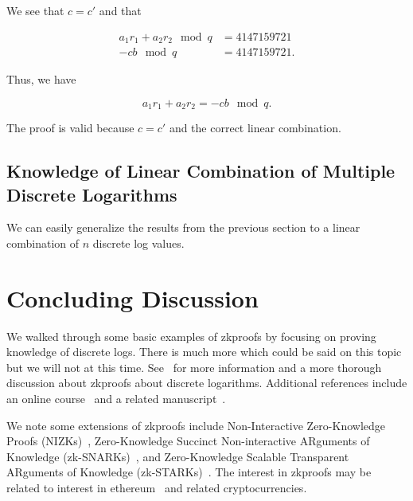 \begin{example}
\noindent
We see that $c=c'$ and that

\begin{align}
    a_{1}r_{1} + a_{2}r_{2} \mod q &= 4147159721 \nonumber\\
    -cb \mod q &= 4147159721.
\end{align}

\noindent
Thus, we have

\begin{equation}
    a_{1}r_{1} + a_{2}r_{2} = -cb \mod q.
\end{equation}

\noindent
The proof is valid because $c=c'$ and the correct linear combination.


\end{example}

\subsection{Knowledge of Linear Combination of Multiple Discrete Logarithms}

We can easily generalize the results from the previous section
to a linear combination of $n$ \gls{discrete log} values.



\section{Concluding Discussion}

We walked through some basic examples of \glspl{zkproof}
by focusing on proving knowledge of \glspl{discrete log}.
There is much more which could be said on this topic
but we will not at this time.
See~\cite{GeneralDiscreteLogProofs} for more information
and a more thorough discussion about \glspl{zkproof}
about discrete logarithms.
Additional references include an online course~\cite{OnlineMOOCZKProofs}
and a related manuscript~\cite{ThalerProofsZK}.

We note some extensions of \glspl{zkproof} include
Non-Interactive Zero-Knowledge Proofs
(NIZKs)~\cite{rackoff1991nizk,santis1987nizk},
Zero-Knowledge Succinct Non-interactive ARguments of Knowledge
(zk-SNARKs)~\cite{cryptoeprint:2011:443},
and Zero-Knowledge Scalable Transparent ARguments of Knowledge
(zk-STARKs)~\cite{cryptoeprint:2018:046,cryptoeprint:2018:1098}.
The interest in \glspl{zkproof} may be related
to interest in \gls{ethereum}~\cite{EthereumYellowpaper}
and related cryptocurrencies.
